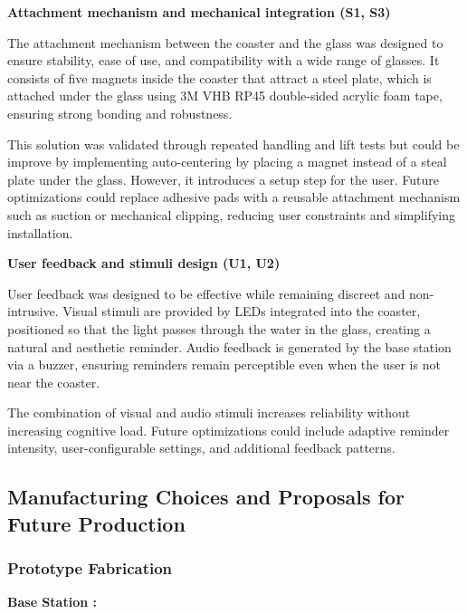 \documentclass{article}
\begin{document}
\noindent \textbf{Attachment mechanism and mechanical integration (S1, S3)}\vspace{0.2cm}

The attachment mechanism between the coaster and the glass was designed to ensure stability, ease of use, and compatibility with a wide range of glasses. It consists of five magnets inside the coaster that attract a steel plate, which is attached under the glass using 3M VHB RP45 \cite{VHB} double-sided acrylic foam tape, ensuring strong bonding and robustness.\vspace{0.2cm}

This solution was validated through repeated handling and lift tests but could be improve by implementing auto-centering by placing a magnet instead of a steal plate under the glass. However, it introduces a setup step for the user. Future optimizations could replace adhesive pads with a reusable attachment mechanism such as suction or mechanical clipping, reducing user constraints and simplifying installation.\vspace{0.2cm}

\noindent \textbf{User feedback and stimuli design (U1, U2)}\vspace{0.2cm}

User feedback was designed to be effective while remaining discreet and non-intrusive. Visual stimuli are provided by LEDs integrated into the coaster, positioned so that the light passes through the water in the glass, creating a natural and aesthetic reminder. Audio feedback is generated by the base station via a buzzer, ensuring reminders remain perceptible even when the user is not near the coaster.\vspace{0.2cm}

The combination of visual and audio stimuli increases reliability without increasing cognitive load. Future optimizations could include adaptive reminder intensity, user-configurable settings, and additional feedback patterns.\vspace{0.2cm}




\subsection{Manufacturing Choices and Proposals for Future Production}

\subsubsection{Prototype Fabrication}
\textbf{Base Station :}\vspace{0.2cm}
\end{document}
